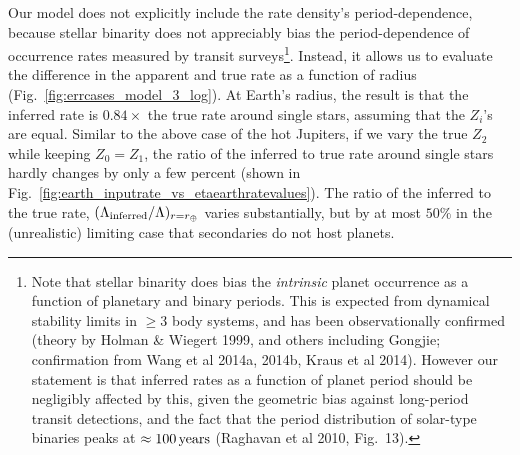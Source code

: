 Our model does not explicitly include the rate density's period-dependence, 
because stellar binarity does not appreciably bias the period-dependence of 
occurrence rates measured by transit surveys\footnote{
    Note that stellar binarity does bias the {\it intrinsic} planet 
    occurrence as a function of planetary and binary periods. This is expected 
    from dynamical stability limits in $\geq$3 body systems, and has been 
    observationally confirmed (theory by Holman \& Wiegert 1999, and others 
    including Gongjie; confirmation from Wang et al 2014a, 2014b, Kraus et al 
    2014). 
    However our statement is that inferred rates as a function of planet     
    period should be negligibly affected by this, given the geometric bias 
    against long-period transit detections, and the fact that the period 
    distribution of solar-type binaries peaks at $\approx 100\,{\rm years}$ 
    (Raghavan et al 2010, Fig.~13).
}.
Instead, it allows us to evaluate the difference in the apparent and true rate 
as a function of radius 
(Fig.~\ref{fig:errcases_model_3_log}).
At Earth's radius, the result is that the inferred rate is $0.84\times$ the 
true rate around single stars, assuming that the $Z_i$'s are equal.
Similar to the above case of the hot Jupiters, if we vary the true $Z_2$ 
while keeping $Z_0 = Z_1$, the ratio of the inferred to true rate 
around single stars hardly 
changes by only a few percent (shown in 
Fig.~\ref{fig:earth_inputrate_vs_etaearthratevalues}).
The ratio of the inferred to the true rate, $(\Lambda_{\rm 
inferred}/\Lambda)_{r=r_\oplus}$ varies substantially, but by at most $50\%$ 
in the (unrealistic) limiting case that secondaries do not host planets.


